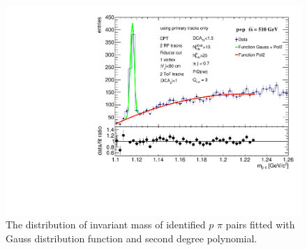 \FloatBarrier
\begin{figure}[ht]
    \centering
    \includegraphics[width=1\textwidth]{figures/LambdaFitQuad.pdf}
    \caption[Distribution of invariant pion proton pairs fitted with Gauss distribution and 2. degree polynomial.]{The distribution of invariant mass of identified $p$ $\pi$ pairs fitted with Gauss distribution function and second degree polynomial.}
    \label{af16}
\end{figure}
\FloatBarrier



